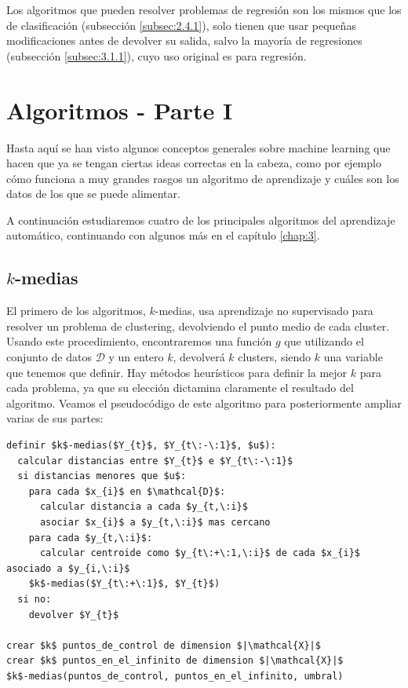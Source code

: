 Los algoritmos que pueden resolver problemas de regresión son los mismos que los de clasificación (subsección \ref{subsec:2.4.1}), solo tienen que usar pequeñas modificaciones antes de devolver su salida, salvo la mayoría de regresiones (subsección \ref{subsec:3.1.1}), cuyo uso original es para regresión.

\section{Algoritmos - Parte I} \label{sec:2.5}

Hasta aquí se han visto algunos conceptos generales sobre machine learning que hacen que ya se tengan ciertas ideas correctas en la cabeza, como por ejemplo cómo funciona a muy grandes rasgos un algoritmo de aprendizaje y cuáles son los datos de los que se puede alimentar.

A continuación estudiaremos cuatro de los principales algoritmos del aprendizaje automático, continuando con algunos más en el capítulo \ref{chap:3}.

\subsection{$k$-medias} \label{subsec:2.5.1}

El primero de los algoritmos, $k$-medias, usa aprendizaje no supervisado para resolver un problema de clustering, devolviendo el punto medio de cada cluster. Usando este procedimiento, encontraremos una función $g$ que utilizando el conjunto de datos $\mathcal{D}$ y un entero $k$, devolverá $k$ clusters, siendo $k$ una variable que tenemos que definir. Hay métodos heurísticos para definir la mejor $k$ para cada problema, ya que su elección dictamina claramente el resultado del algoritmo. Veamos el pseudocódigo de este algoritmo para posteriormente ampliar varias de sus partes:

\vspace*{3mm}
\lstset{style=pseudocode}
\begin{lstlisting}
definir $k$-medias($Y_{t}$, $Y_{t\:-\:1}$, $u$):
  calcular distancias entre $Y_{t}$ e $Y_{t\:-\:1}$
  si distancias menores que $u$:
    para cada $x_{i}$ en $\mathcal{D}$:
      calcular distancia a cada $y_{t,\:i}$
      asociar $x_{i}$ a $y_{t,\:i}$ mas cercano
    para cada $y_{t,\:i}$:
      calcular centroide como $y_{t\:+\:1,\:i}$ de cada $x_{i}$ asociado a $y_{i,\:i}$
    $k$-medias($Y_{t\:+\:1}$, $Y_{t}$)
  si no:
    devolver $Y_{t}$

crear $k$ puntos_de_control de dimension $|\mathcal{X}|$
crear $k$ puntos_en_el_infinito de dimension $|\mathcal{X}|$
$k$-medias(puntos_de_control, puntos_en_el_infinito, umbral)
\end{lstlisting}

